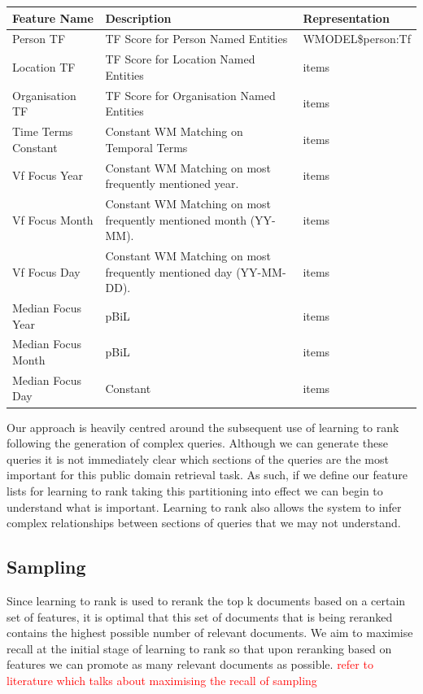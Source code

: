 \documentclass{mpaper}
\newcommand{\remove}[1]{\textcolor{red}{#1}}
\begin{document}
\begin{table}[t] \label{table:features}
\centering
\begin{tabular}{|p{4cm}|p{6cm}|p{4cm}|}
\hline
Feature Name 		& Description  	& Representation \\ \hline
Person TF 			& TF Score for Person Named Entities 		& WMODEL\$person:Tf  \\ \hline
Location TF 		& TF Score for Location Named Entities 		& items  \\ \hline
Organisation TF 	& TF Score for Organisation Named Entities 		& items  \\ \hline
Time Terms Constant & Constant WM Matching on Temporal Terms			& items  \\ \hline
Vf Focus Year 		& Constant WM Matching on most frequently mentioned year. 		& items  \\ \hline
Vf Focus Month 		& Constant WM Matching on most frequently mentioned month (YY-MM).  		& items  \\ \hline
Vf Focus Day 		& Constant WM Matching on most frequently mentioned day (YY-MM-DD).  		& items  \\ \hline
Median Focus Year 	& pBiL 		& items  \\ \hline
Median Focus Month 	& pBiL 		& items  \\ \hline
Median Focus Day 	& Constant 		& items  \\ \hline
\end{tabular}
\end{table}
Our approach is heavily centred around the subsequent use of learning to rank following the generation of complex queries.
Although we can generate these queries it is not immediately clear which sections of the queries are the most important for this public domain retrieval task.
As such, if we define our feature lists for learning to rank taking this partitioning into effect we can begin to understand what is important.
Learning to rank also allows the system to infer complex relationships between sections of queries that we may not understand.

\subsection{Sampling}
Since learning to rank is used to rerank the top k documents based on a certain set of features, it is optimal that this set of documents that is being reranked contains the highest possible number of relevant documents.
We aim to maximise recall at the initial stage of learning to rank so that upon reranking based on features we can promote as many relevant documents as possible.
\remove{refer to literature which talks about maximising the recall of sampling}
\end{document}
